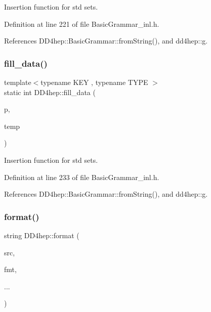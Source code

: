 Insertion function for std sets. 



Definition at line 221 of file Basic\+Grammar\+\_\+inl.\+h.



References D\+D4hep\+::\+Basic\+Grammar\+::from\+String(), and dd4hep\+::g.

\hypertarget{namespace_d_d4hep_a63f8b19a86abe7a75745937d7e0b4022}{}\label{namespace_d_d4hep_a63f8b19a86abe7a75745937d7e0b4022} 
\subsubsection{\texorpdfstring{fill\+\_\+data()}{fill\_data()}\hspace{0.1cm}{\footnotesize\ttfamily [5/5]}}
{\footnotesize\ttfamily template$<$typename K\+EY , typename T\+Y\+PE $>$ \\
static int D\+D4hep\+::fill\+\_\+data (\begin{DoxyParamCaption}\item[{std\+::map$<$ K\+EY, T\+Y\+PE $>$ $\ast$}]{p,  }\item[{const std\+::vector$<$ std\+::string $>$ \&}]{temp }\end{DoxyParamCaption})\hspace{0.3cm}{\ttfamily [static]}}



Insertion function for std sets. 



Definition at line 233 of file Basic\+Grammar\+\_\+inl.\+h.



References D\+D4hep\+::\+Basic\+Grammar\+::from\+String(), and dd4hep\+::g.

\hypertarget{namespace_d_d4hep_a643d67cdbd95090fbcc93cdd3e4a8ad8}{}\label{namespace_d_d4hep_a643d67cdbd95090fbcc93cdd3e4a8ad8} 
\subsubsection{\texorpdfstring{format()}{format()}\hspace{0.1cm}{\footnotesize\ttfamily [1/4]}}
{\footnotesize\ttfamily string D\+D4hep\+::format (\begin{DoxyParamCaption}\item[{const std\+::string \&}]{src,  }\item[{const std\+::string \&}]{fmt,  }\item[{}]{... }\end{DoxyParamCaption})}


